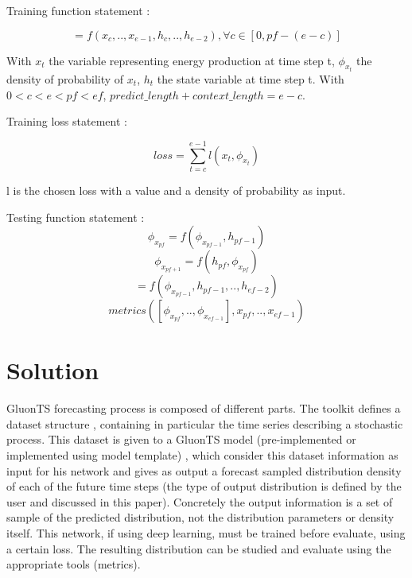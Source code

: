 \documentclass[a4paper, 12pt]{article}
\begin{document}
Training function statement : 

\begin{equation}
    [\phi_{x_c},..,\phi_{x_{e-1}}] = f({x_c},..,{x_{e-1}}, {h_c},..,{h_{e-2}}), \forall c \in [0, pf-(e-c)]
\end{equation}

With $x_t$ the variable representing energy production at time step t, $\phi_{x_t}$  the density of probability of $x_t$, $h_t$ the state variable at time step t. With $0<c<e<pf<ef$, $predict\_length + context\_length  = e-c$.

Training loss statement :


\begin{equation}
    loss = \sum^{e-1}_{t=c}l(x_t,\phi_{x_t})
\end{equation}

l is the chosen loss with a value and a density of probability as input.

Testing function statement :
\begin{equation}
    \phi_{x_{pf}} = f(\phi_{x_{pf-1}},h_{pf-1})
\end{equation}
\begin{equation}
    \phi_{x_{pf+1}} = f(h_{pf},\phi_{x_{pf}} )
\end{equation}
\begin{equation}
    [\phi_{x_{pf}},..,\phi_{x_{ef-1}}] = f(\phi_{x_{pf-1}},h_{pf-1},..,h_{ef-2})
\end{equation}
\begin{equation}
    metrics([\phi_{x_{pf}},..,\phi_{x_{ef-1}}],{x_{pf}},..,{x_{ef-1}})
\end{equation}



\section{Solution}

GluonTS forecasting process is composed of different parts.
The toolkit defines a dataset structure , containing in particular the time series describing a stochastic process. This dataset is given to a GluonTS model (pre-implemented or implemented using model template) , which consider this dataset information as input for his network and gives as output a forecast sampled distribution density of each of the future time steps (the type of output distribution is defined by the user and discussed in this paper). Concretely the output information is a set of sample of the predicted distribution,
not the distribution parameters or density itself.
This network, if using deep learning, must be trained before evaluate, using a certain loss.
The resulting distribution can be studied and evaluate using the appropriate tools (metrics).
\end{document}
